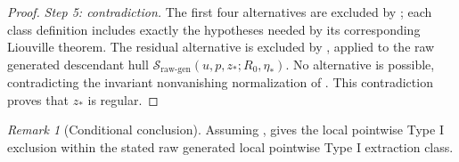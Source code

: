 \documentclass[11pt]{amsart}
\theoremstyle{plain}
\theoremstyle{definition}
\theoremstyle{remark}
\newtheorem{remark}[remark]{Remark}
\numberwithin{equation}{section}
\newcommand{\calS}{\mathcal S}
\begin{document}
\begin{proof}
\emph{Step 5: contradiction.}
The first four alternatives are excluded by
; each class definition includes exactly
the hypotheses needed by its corresponding Liouville theorem.  The residual
alternative is excluded by , applied to the raw
generated descendant hull
\(\calS_{\mathrm{raw\text{-}gen}}(u,p,z_*;R_0,\eta_*)\).  No alternative is possible, contradicting
the invariant nonvanishing normalization of .
This contradiction proves that \(z_*\) is regular.
\end{proof}

\begin{remark}[Conditional conclusion]
Assuming ,  gives the
local pointwise Type I exclusion within the stated raw generated local pointwise
Type I extraction class.
\end{remark}
\end{document}
